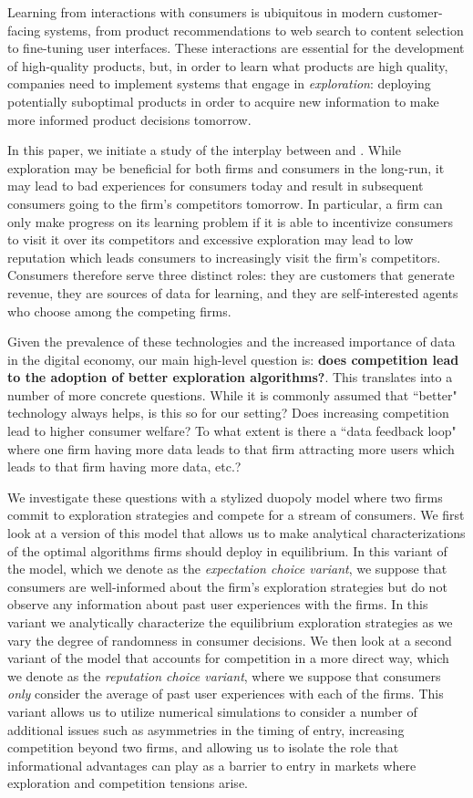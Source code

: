 Learning from interactions with consumers is ubiquitous in modern customer-facing systems, from product recommendations to web search to content selection to fine-tuning user interfaces. These interactions are essential for the development of high-quality products, but, in order to learn what products are high quality, companies need to implement systems that engage in \emph{exploration}: deploying potentially suboptimal products in order to acquire new information to make more informed product decisions tomorrow.

In this paper, we initiate a study of the interplay between \exploration and \competition. While exploration may be beneficial for both firms and consumers in the long-run, it may lead to bad experiences for consumers today and result in subsequent consumers going to the firm's competitors tomorrow. In particular, a firm can only make progress on its learning problem if it is able to incentivize consumers to visit it over its competitors and excessive exploration may lead to low reputation which leads consumers to increasingly visit the firm's competitors. Consumers therefore serve three distinct roles: they are customers that generate revenue, they are sources of data for learning, and they are self-interested agents who choose among the competing firms.

Given the prevalence of these technologies and the increased importance of data in the digital economy, our main high-level question is: {\bf does competition lead to the adoption of better exploration algorithms?}. This translates into a number of more concrete questions. While it is commonly assumed that ``better" technology always helps, is this so for our setting? Does increasing competition lead to higher consumer welfare? To what extent is there a ``data feedback loop" where one firm having more data leads to that firm attracting more users which leads to that firm having more data, etc.?

We investigate these questions with a stylized duopoly model where two firms commit to exploration strategies and compete for a stream of consumers. We first look at a version of this model that allows us to make analytical characterizations of the optimal algorithms firms should deploy in equilibrium. In this variant of the model, which we denote as the \textit{expectation choice variant}, we suppose that consumers are well-informed about the firm's exploration strategies but do not observe any information about past user experiences with the firms. In this variant we analytically characterize the equilibrium exploration strategies as we vary the degree of randomness in consumer decisions. We then look at a second variant of the model that accounts for competition in a more direct way, which we denote as the \textit{reputation choice variant}, where we suppose that consumers \textit{only} consider the average of past user experiences with each of the firms. This variant allows us to utilize numerical simulations to consider a number of additional issues such as asymmetries in the timing of entry, increasing competition beyond two firms, and allowing us to isolate the role that informational advantages can play as a barrier to entry in markets where exploration and competition tensions arise.

